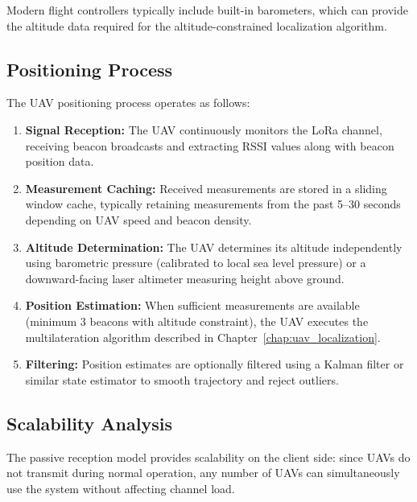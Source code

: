 \documentclass[master,final,11pt]{iscs-thesis}
\begin{document}
Modern flight controllers typically include built-in barometers, which can provide the altitude data required for the altitude-constrained localization algorithm.

\subsection{Positioning Process}

The UAV positioning process operates as follows:

\begin{enumerate}
    \item \textbf{Signal Reception:} The UAV continuously monitors the LoRa channel, receiving beacon broadcasts and extracting RSSI values along with beacon position data.
    
    \item \textbf{Measurement Caching:} Received measurements are stored in a sliding window cache, typically retaining measurements from the past 5--30 seconds depending on UAV speed and beacon density.
    
    \item \textbf{Altitude Determination:} The UAV determines its altitude independently using barometric pressure (calibrated to local sea level pressure) or a downward-facing laser altimeter measuring height above ground.
    
    \item \textbf{Position Estimation:} When sufficient measurements are available (minimum 3 beacons with altitude constraint), the UAV executes the multilateration algorithm described in Chapter~\ref{chap:uav_localization}.
    
    \item \textbf{Filtering:} Position estimates are optionally filtered using a Kalman filter or similar state estimator to smooth trajectory and reject outliers.
\end{enumerate}

\subsection{Scalability Analysis}

The passive reception model provides scalability on the client side: since UAVs do not transmit during normal operation, any number of UAVs can simultaneously use the system without affecting channel load.
\end{document}
